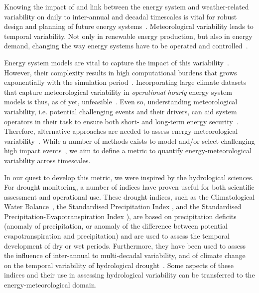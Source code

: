 \documentclass[a4paper,11pt]{extarticle}
\begin{document}
Knowing the impact of and link between the energy system and weather-related variability on daily to inter-annual and decadal timescales is vital for robust design and planning of future energy systems~\autocite{Bloomfield2021nextgen,craig2022disconnect,McKenna2022}. 
Meteorological variability leads to temporal variability. 
Not only in renewable energy production, but also in energy demand, changing the way energy systems have to be operated and controlled~\autocite{craig2022disconnect}.

Energy system models are vital to capture the impact of this variability~\parencite{gernaat2021climate}. 
However, their complexity results in high computational burdens that grows exponentially with the simulation period~\parencite{wuijts2022modelchar,Price2022,craig2022disconnect,wuijts2023linking,Grochowicz2023}. 
Incorporating large climate datasets that capture meteorological variability in \emph{operational hourly} energy system models is thus, as of yet, unfeasible~\parencite{Harang2020,craig2022disconnect,wuijts2023linking}. 
Even so, understanding meteorological variability, i.e. potential challenging events and their drivers, can aid  system operators in their task to ensure both short- and long-term energy security~\parencite{craig2022disconnect,wuijts2023linking,Hu2023}. 
Therefore, alternative approaches are needed to assess energy-meteorological variability~\parencite{craig2022disconnect,Dubus2022PECD}. 
While a number of methods exists to model and/or select challenging high impact events~\parencite[e.g.][]{vanderwiel2019extreme,Ohlendorf2020,OteroFelipe2021,stoop2021detection,vanderMost2022,Boston2022,Hu2023}, we aim to define a metric to quantify energy-meteorological variability across timescales.

In our quest to develop this metric, we were inspired by the hydrological sciences. 
For drought monitoring, a number of indices have proven useful for both scientific assessment and operational use. 
These drought indices, such as the Climatological Water Balance~\parencite[CWB;][]{gleick1985regional,Gleick1986}, the Standardised Precipitation Index \parencite[SPI;][]{mckee1993}, and the Standardised Precipitation-Evapotranspiration Index \parencite[SPEI;][]{VicenteSerrano2010}), are based on precipitation deficits (anomaly of precipitation, or anomaly of the difference between potential evapotranspiration and precipitation) and are used to assess the temporal development of dry or wet periods. 
Furthermore, they have been used to assess the influence of inter-annual to multi-decadal variability, and of climate change on the temporal variability of hydrological drought~\parencite[e.g.][]{Quiring2009,Stagge2015,Cammalleri2021,vanderWiel2022}. 
Some aspects of these indices and their use in assessing hydrological variability can be transferred to the energy-meteorological domain.
\end{document}

